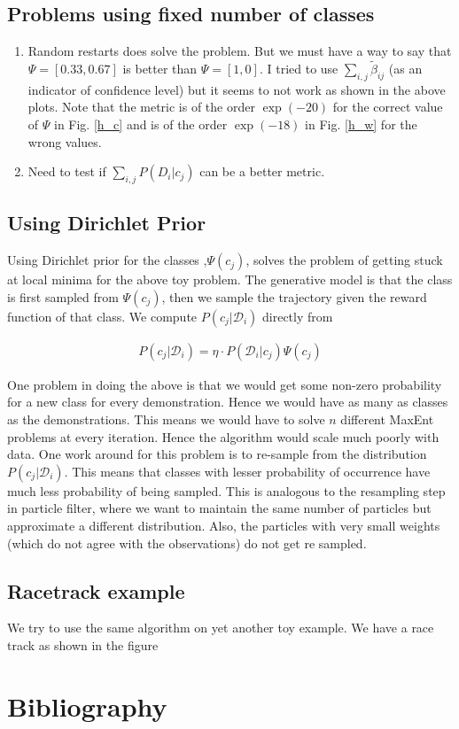 \documentclass{article}[11pt]
\begin{document}
\subsection{Problems using fixed number of classes}

\begin{enumerate}
\item Random restarts does solve the problem. But we must have a way to say that $\Psi = [0.33,0.67]$ is better than $\Psi = [1,0]$. I tried to use $\sum_{i,j} \tilde{\beta}_{ij}$ (as an indicator of confidence level) but it seems to not work as shown in the above plots. Note that the metric is of the order $\exp(-20)$ for the correct value of $\Psi$ in Fig. \ref{h_c} and is of the order $\exp(-18)$ in Fig. \ref{h_w} for the wrong values. 
\item Need to test if $\sum_{i,j}P(D_i|c_j)$ can be a better metric.
\end{enumerate}

\subsection{Using Dirichlet Prior}
Using Dirichlet prior for the classes ,$\Psi(c_j)$, solves the problem of getting stuck at local minima for the above toy problem. The generative model is that the class is first sampled from $\Psi(c_j)$, then we sample the trajectory given the reward function of that class. We compute $P(c_j|\mathcal{D}_i)$ directly from 

\begin{align*}
P(c_j|\mathcal{D}_i) = \eta \cdot P(\mathcal{D}_i|c_j)\Psi(c_j)
\end{align*} 

One problem in doing the above is that we would get some non-zero probability for a new class for every demonstration. Hence we would have as many as classes as the demonstrations. This means we would have to solve $n$ different MaxEnt problems at every iteration. Hence the algorithm would scale much poorly with data. One work around for this problem is to re-sample from the distribution  $P(c_j|\mathcal{D}_i)$. This means that classes with lesser probability of occurrence have much less probability of being sampled. This is analogous to the resampling step in particle filter, where we want to maintain the same number of particles but approximate a different distribution. Also, the particles with very small weights (which do not agree with the observations) do not get re sampled.  

\subsection{Racetrack example}
We try to use the same algorithm on yet another toy example. We have a race track as shown in the figure 


\nocite{ziebart2010modeling}
\section{Bibliography}



\end{document}
